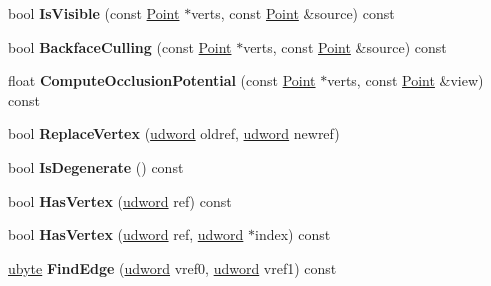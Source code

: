 \begin{DoxyCompactItemize}
\item 
bool {\bfseries Is\+Visible} (const \hyperlink{classPoint}{Point} $\ast$verts, const \hyperlink{classPoint}{Point} \&source) const \hypertarget{classIndexedTriangle_a6fc8b09c9cc16ce1e7c0b3fd825ddbf2}{}\label{classIndexedTriangle_a6fc8b09c9cc16ce1e7c0b3fd825ddbf2}

\item 
bool {\bfseries Backface\+Culling} (const \hyperlink{classPoint}{Point} $\ast$verts, const \hyperlink{classPoint}{Point} \&source) const \hypertarget{classIndexedTriangle_acac72a5c7e3a7e7963a9e9bc4ed2a3e8}{}\label{classIndexedTriangle_acac72a5c7e3a7e7963a9e9bc4ed2a3e8}

\item 
float {\bfseries Compute\+Occlusion\+Potential} (const \hyperlink{classPoint}{Point} $\ast$verts, const \hyperlink{classPoint}{Point} \&view) const \hypertarget{classIndexedTriangle_a4df6adef9fba2d9426e13f03a12b0ea1}{}\label{classIndexedTriangle_a4df6adef9fba2d9426e13f03a12b0ea1}

\item 
bool {\bfseries Replace\+Vertex} (\hyperlink{IceTypes_8h_a44c6f1920ba5551225fb534f9d1a1733}{udword} oldref, \hyperlink{IceTypes_8h_a44c6f1920ba5551225fb534f9d1a1733}{udword} newref)\hypertarget{classIndexedTriangle_af5a5f522cb0b97eb27fc5bb62e6fc4e7}{}\label{classIndexedTriangle_af5a5f522cb0b97eb27fc5bb62e6fc4e7}

\item 
bool {\bfseries Is\+Degenerate} () const \hypertarget{classIndexedTriangle_a5ddd2c34c037481e0ba2b36b39e3f9ac}{}\label{classIndexedTriangle_a5ddd2c34c037481e0ba2b36b39e3f9ac}

\item 
bool {\bfseries Has\+Vertex} (\hyperlink{IceTypes_8h_a44c6f1920ba5551225fb534f9d1a1733}{udword} ref) const \hypertarget{classIndexedTriangle_a5044242b46d49fd7b728f96b8d945e10}{}\label{classIndexedTriangle_a5044242b46d49fd7b728f96b8d945e10}

\item 
bool {\bfseries Has\+Vertex} (\hyperlink{IceTypes_8h_a44c6f1920ba5551225fb534f9d1a1733}{udword} ref, \hyperlink{IceTypes_8h_a44c6f1920ba5551225fb534f9d1a1733}{udword} $\ast$index) const \hypertarget{classIndexedTriangle_a3698519a215745600e9a40ce49eca410}{}\label{classIndexedTriangle_a3698519a215745600e9a40ce49eca410}

\item 
\hyperlink{IceTypes_8h_a5dd4f281954ce1405c92d62a427f839a}{ubyte} {\bfseries Find\+Edge} (\hyperlink{IceTypes_8h_a44c6f1920ba5551225fb534f9d1a1733}{udword} vref0, \hyperlink{IceTypes_8h_a44c6f1920ba5551225fb534f9d1a1733}{udword} vref1) const \hypertarget{classIndexedTriangle_aa8fc0c2b6623832647fa880e98de23b7}{}\label{classIndexedTriangle_aa8fc0c2b6623832647fa880e98de23b7}


\end{DoxyCompactItemize}
